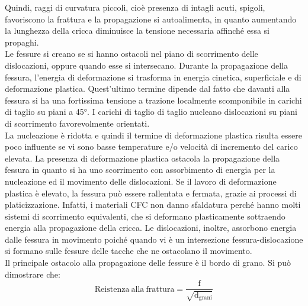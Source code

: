 Quindi, raggi di curvatura piccoli, cioè presenza di intagli acuti, spigoli, favoriscono la frattura e la propagazione si autoalimenta, in quanto aumentando la lunghezza della cricca diminuisce la tensione necessaria affinché essa si propaghi.\\
Le fessure si creano se si hanno ostacoli nel piano di scorrimento delle dislocazioni, oppure quando esse si intersecano. Durante la propagazione della fessura, l’energia di deformazione si trasforma in energia cinetica, superficiale e di deformazione plastica. Quest’ultimo termine dipende dal fatto che davanti alla fessura si ha una fortissima tensione a trazione localmente scomponibile in carichi di taglio su piani a 45°. I carichi di taglio di taglio nucleano dislocazioni su piani di scorrimento favorevolmente orientati.\\
La nucleazione è ridotta e quindi il termine di deformazione plastica risulta essere poco influente se vi sono basse temperature e/o velocità di incremento del carico elevata. La presenza di deformazione plastica ostacola la propagazione della fessura in quanto si ha uno scorrimento con assorbimento di energia per la nucleazione ed il movimento delle dislocazioni. Se il lavoro di deformazione plastica è elevato, la fessura può essere rallentata e fermata, grazie ai processi di platicizzazione. Infatti, i materiali CFC non danno sfaldatura perché hanno molti sistemi di scorrimento equivalenti, che si deformano plasticamente sottraendo energia alla propagazione della cricca. Le dislocazioni, inoltre, assorbono energia dalle fessura in movimento poiché quando vi è un intersezione fessura-dislocazione si formano sulle fessure delle tacche che ne ostacolano il movimento.\\
Il principale ostacolo alla propagazione delle fessure è il bordo di grano.
Si può dimostrare che:
\begin{equation*}
    \mathrm{Reistenza\> alla\> frattura = \frac{f}{\sqrt{d_{grani}}}}
\end{equation*}

